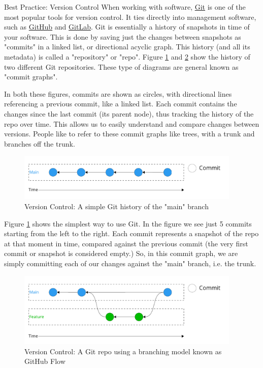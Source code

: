 \documentclass[final]{beamer}
\newlength{\colwidth}
\begin{document}
\begin{frame}[t]
\begin{columns}[t]
\begin{column}{\colwidth}
\begin{block}{Best Practice: Version Control}
    When working with software, \href{https://git-scm.com/}{Git} is one of the
    most popular tools for version control.
    It ties directly into management software, such as
    \href{https://github.com}{GitHub} and \href{https://gitlab.com}{GitLab}.
    Git is essentially a history of snapshots in time of your software.
    This is done by saving just the changes between snapshots as "commits" in
    a linked list, or directional acyclic graph.
    This history (and all its metadata) is called a "repository" or "repo".
    Figure \ref{fig:git-simple} and \ref{fig:git-github-flow} show the history
    of two different Git repositories.
    These type of diagrams are general known as "commit graphs".
    
    In both these figures, commits are shown as circles, with directional lines
    referencing a previous commit, like a linked list.
    Each commit contains the changes since the last commit (its parent node),
    thus tracking the history of the repo over time.
    This allows us to easily understand and compare changes between versions.
    People like to refer to these commit graphs like trees, with a trunk and
    branches off the trunk.

    \begin{figure}
      \centering
      \includegraphics[width=0.95\textwidth]{tess2024/git-simple-git-repo.pdf}
      \caption{Version Control: A simple Git history of the "main" branch}
      \label{fig:git-simple}
    \end{figure}

    Figure \ref*{fig:git-simple} shows the simplest way to use Git.
    In the figure we see just 5 commits starting from the left to the right.
    Each commit represents a snapshot of the repo at that moment in time,
    compared against the previous commit (the very first commit or snapshot
    is considered empty.)
    So, in this commit graph, we are simply committing each of our changes
    against the "main" branch, i.e. the trunk.

    \begin{figure}
      \centering
      \includegraphics[width=0.95\textwidth]{tess2024/git-github-flow.pdf}
      \caption{Version Control: A Git repo using a branching model known as
        GitHub Flow}
      \label{fig:git-github-flow}
    \end{figure}


\end{block}
\end{column}
\end{columns}
\end{frame}
\end{document}
